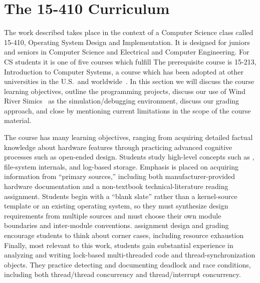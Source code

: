 \section{The 15-410 Curriculum}
\label{sec:curriculum}

The work described takes place in the context of a
Computer Science class called
15-410, Operating System Design and Implementation.
It is designed for juniors and seniors in Computer Science
and Electrical and Computer Engineering.
For CS students it is one of five courses which fulfill
The prerequisite course is 15-213,
Introduction to Computer Systems,
a course which has been adopted at other
universities in the U.S.\ and worldwide~\cite{sigcse01:CSaPP}.
In this section we will discuss the course learning
objectives,
outline the programming projects,
discuss our use of Wind River Simics~\cite{simics} as
the simulation/debugging environment,
discuss our grading approach,
and close by mentioning current limitations in the scope
of the course material.

The course has many learning objectives,
ranging from acquiring detailed factual knowledge about
hardware features
through practicing advanced cognitive processes
such as open-ended design.
%
Students study high-level concepts
such as
,
file-system internals,
and log-based storage.
%
Emphasis is placed on acquiring information from ``primary sources,''
including both manufacturer-provided hardware documentation
and a non-textbook technical-literature reading assignment.
%
Students begin with a ``blank slate'' rather than a
kernel-source template or an existing operating system,
so they must synthesize design requirements from multiple sources
and must
choose their own module boundaries and inter-module conventions.
%
assignment design and grading encourage students to
think about corner cases, including resource exhaustion
%
Finally, most relevant to this work,
students gain substantial experience in
analyzing and writing lock-based multi-threaded code and
thread-synchronization objects.
They practice detecting and documenting deadlock and race conditions,
including both thread/thread concurrency and thread/interrupt concurrency.

